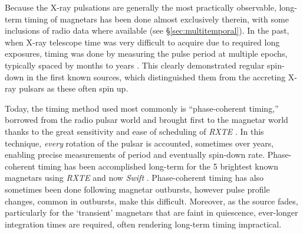 Because the X-ray pulsations are generally the most practically observable,
long-term timing of magnetars has been done almost exclusively therein, with
some inclusions of radio data where available (see \S\ref{sec:multitemporal}).  
In the past, when X-ray telescope time was very difficult to acquire due to required
long exposures, timing was
done by measuring the pulse period at multiple epochs, typically spaced by months
to years \citep[e.g.][]{bs96,bss+00}.  This clearly demonstrated regular spin-down in
the first known sources, which distinguished them from the accreting
X-ray pulsars as these often spin up.

Today, the timing method used most commonly
is ``phase-coherent timing,'' borrowed from the radio pulsar world 
and brought first to the magnetar world thanks to the great sensitivity and ease of scheduling
of {\it RXTE} \citep{kcs99}.  In this technique, 
{\it every} rotation of the pulsar is accounted, sometimes over years, enabling precise measurements
of period and eventually spin-down rate.  Phase-coherent timing has been accomplished
long-term for the 5 brightest known magnetars using {\it RXTE} \citep[see][and references therein]{dk14}
and now {\it Swift} \citep[e.g.][]{akn+13}.  Phase-coherent timing has also sometimes been
done following magnetar outbursts, however pulse profile changes,
common in outbursts, make this difficult.  Moreover, as the source fades, particularly for
the `transient' magnetars that are faint in quiescence,
ever-longer integration times are required, often rendering long-term timing impractical.



